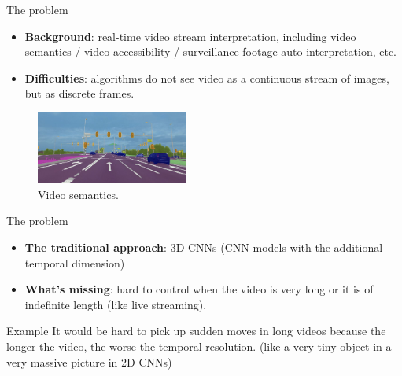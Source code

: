 \documentclass[aspectratio=43,display]{beamer}
\begin{document}
		\begin{frame}{The problem}


			\begin{itemize}
				\item \textbf{Background}: real-time video stream interpretation, including video semantics / video accessibility / surveillance footage auto-interpretation, etc.
				\item \textbf{Difficulties}: algorithms do not see video as a continuous stream of images, but as discrete frames.
			\end{itemize}

			\vskip 0.3cm

			\begin{figure}
				\includegraphics[width=5cm]{images/image-semantics.jpeg}
				\caption{\label{fig:your-figure}Video semantics.}
			\end{figure}


		\end{frame}


		\begin{frame}{The problem}

			\begin{itemize}
				\item \textbf{The traditional approach}: 3D CNNs (CNN models with the additional temporal dimension)
				\item \textbf{What's missing}: hard to control when the video is very long or it is of indefinite length (like live streaming).
			\end{itemize}

			\vskip 0.5cm

			\begin{block}{Example}
				It would be hard to pick up sudden moves in long videos because the longer the video, the worse the temporal resolution.
				(like a very tiny object in a very massive picture in 2D CNNs)
			\end{block}

		\end{frame}
\end{document}
